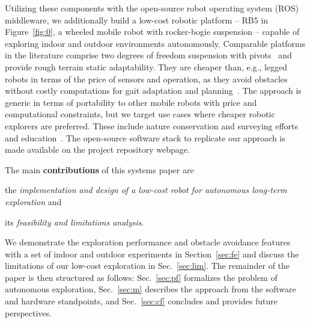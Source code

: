 \documentclass[letterpaper,10pt,conference,twoside]{IEEEtran}
\makeatletter
\theoremstyle{definition}
\newcommand\footnoteref[1]{\protected@xdef\@thefnmark{\ref{#1}}\@footnotemark}
\makeatother
\begin{document}
Utilizing these components %
with the open-source robot operating system (ROS) middleware, we additionally build  
a low-cost %
robotic platform -- RB5 in Figure~\ref{fig:0}, a wheeled mobile robot with rocker-bogie suspension -- capable of exploring indoor and outdoor environments autonomously. 
Comparable platforms in the literature comprise two degrees of freedom suspension with pivots~\cite{setterfield2013terrain,%
faisal2021low} and provide rough terrain static adaptability. %
They are cheaper than, e.g., legged robots in terms of the price of sensors %
and operation, as they %
avoid obstacles without costly computations for gait adaptation and planning~\cite{muller2021openbot}.
The approach is generic in terms of portability to other mobile robots with price and computational constraints, but we target use cases where cheaper robotic explorers are preferred. These include nature conservation and surveying efforts~\cite{kirchgeorg2022multimodal} and education~\cite{betz2022autonomous,amster2020turtlebot}. %
The open-source software stack to replicate our approach is made available on the project repository webpage\footnoteref{link}.

The main \textbf{contributions} of this systems paper are 
\begin{enumerate*}[label={(\roman*)},font={\textit}]
  \item the \textit{implementation and design of a low-cost robot for autonomous long-term exploration} and 
  \item its \textit{feasibility and limitations analysis}. %
\end{enumerate*}
We demonstrate the exploration performance and obstacle avoidance features %
with a set of indoor and outdoor %
experiments in Section~\ref{sec:fe} and discuss the limitations of our low-cost exploration in Sec.~\ref{sec:lim}. The remainder of the paper is then structured as follows: Sec.~\ref{sec:pf} formalizes the problem of autonomous exploration, Sec.~\ref{sec:m} describes the approach from the software and hardware standpoints, and Sec.~\ref{sec:cf} concludes and provides future perspectives.
\end{document}

